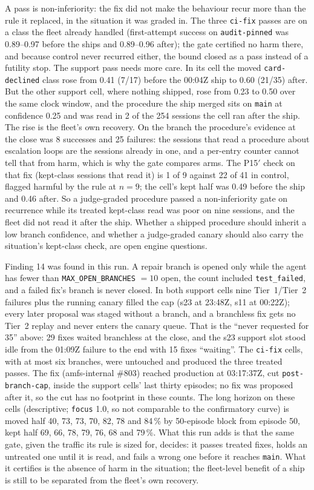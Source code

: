 \documentclass[11pt]{article}
\newcommand{\code}[1]{\texttt{#1}}
\begin{document}
A pass is non-inferiority: the fix did not make the behaviour recur more than the rule it
replaced, in the situation it was graded in. The three \code{ci-fix} passes are on a class the
fleet already handled (first-attempt success on \code{audit-pinned} was 0.89--0.97 before the
ships and 0.89--0.96 after); the gate certified no harm there, and because control never recurred
either, the bound closed as a pass instead of a futility stop. The support pass needs more
care. In its cell the moved \code{card-declined} class rose from 0.41 (7/17) before the 00:04Z
ship to 0.60 (21/35) after. But the other support cell, where nothing shipped, rose from 0.23 to
0.50 over the same clock window, and the procedure the ship merged sits on \code{main} at
confidence 0.25 and was read in 2 of the 254 sessions the cell ran after the ship. The rise is
the fleet's own recovery. On the branch the procedure's evidence at the close was 8 successes
and 25 failures: the sessions that read a procedure about escalation loops are the sessions
already in one, and a per-entry counter cannot tell that from harm, which is why the gate
compares arms. The P15$'$ check on that fix (kept-class sessions that read it) is 1 of 9 against
22 of 41 in control, flagged harmful by the rule at $n=9$; the cell's kept half was 0.49 before
the ship and 0.46 after. So a judge-graded procedure passed a non-inferiority gate on recurrence
while its treated kept-class read was poor on nine sessions, and the fleet did not read it after
the ship. Whether a shipped procedure should inherit a low branch confidence, and whether a
judge-graded canary should also carry the situation's kept-class check, are open engine
questions.

Finding 14 was found in this run. A repair branch is opened only while the agent has fewer than
\code{MAX\_OPEN\_BRANCHES} $=10$ open, the count included \code{test\_failed}, and a failed
fix's branch is never closed. In both support cells nine Tier~1/Tier~2 failures plus the running
canary filled the cap (s23 at 23:48Z, s11 at 00:22Z); every later proposal was staged without a
branch, and a branchless fix gets no Tier~2 replay and never enters the canary queue. That is the
``never requested for 35'' above: 29 fixes waited branchless at the close, and the s23 support
slot stood idle from the 01:09Z failure to the end with 15 fixes ``waiting''. The \code{ci-fix}
cells, with at most six branches, were untouched and produced the three treated passes. The fix
(amfs-internal \#803) reached production at 03:17:37Z, cut \code{post-branch-cap}, inside the
support cells' last thirty episodes; no fix was proposed after it, so the cut has no footprint
in these counts. The long horizon on these cells (descriptive; \code{focus} 1.0, so not
comparable to the confirmatory curve) is moved half 40, 73, 73, 70, 82, 78 and 84\,\% by
50-episode block from episode 50, kept half 69, 66, 78, 79, 76, 68 and 79\,\%. What this run
adds is that the same gate, given the traffic its rule is sized for, decides: it passes treated
fixes, holds an untreated one until it is read, and fails a wrong one before it reaches
\code{main}. What it certifies is the absence of harm in the situation; the fleet-level benefit
of a ship is still to be separated from the fleet's own recovery.
\end{document}
